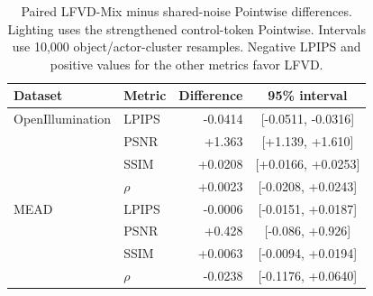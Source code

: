 \begin{table}[t]
\centering
\caption{Paired LFVD-Mix minus shared-noise Pointwise differences. Lighting
uses the strengthened control-token Pointwise. Intervals use 10,000
object/actor-cluster resamples. Negative LPIPS and positive values for the
other metrics favor LFVD.}
\label{tab:paired_ci}
\scriptsize
\setlength{\tabcolsep}{3pt}
\begin{tabular*}{\linewidth}{@{\extracolsep{\fill}}llrc@{}}
\toprule
Dataset & Metric & Difference & 95\% interval\\
\midrule
OpenIllumination & LPIPS & -0.0414 & [-0.0511, -0.0316] \\
 & PSNR & +1.363 & [+1.139, +1.610] \\
 & SSIM & +0.0208 & [+0.0166, +0.0253] \\
 & $\rho$ & +0.0023 & [-0.0208, +0.0243] \\
\midrule
MEAD & LPIPS & -0.0006 & [-0.0151, +0.0187] \\
 & PSNR & +0.428 & [-0.086, +0.926] \\
 & SSIM & +0.0063 & [-0.0094, +0.0194] \\
 & $\rho$ & -0.0238 & [-0.1176, +0.0640] \\
\bottomrule
\end{tabular*}
\end{table}
